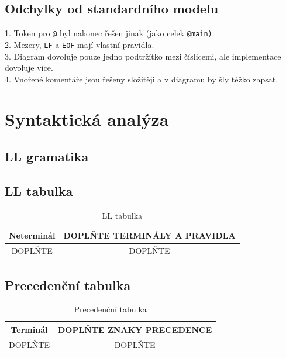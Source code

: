 \documentclass[10pt,a4paper]{article}
\begin{document}
\subsection{Odchylky od standardního modelu}
1. Token pro \texttt{@} byl nakonec řešen jinak (jako celek \texttt{@main)}. \\
2. Mezery, \texttt{LF} a \texttt{EOF} mají vlastní pravidla. \\
3. Diagram dovoluje pouze jedno podtržítko mezi číslicemi, ale implementace dovoluje více. \\
4. Vnořené komentáře jsou řešeny složitěji a v diagramu by šly těžko zapsat.

\section{Syntaktická analýza}
\subsection{LL gramatika}

\subsection{LL tabulka}

\begin{table}[H]
    \centering
    \caption{LL tabulka}
    \label{tab:ll}
    \begin{tabular}{c|c}
        \toprule
        \textbf{Neterminál} & \textbf{DOPLŇTE TERMINÁLY A PRAVIDLA} \\
        \midrule
        DOPLŇTE & DOPLŇTE \\
        \bottomrule
    \end{tabular}
\end{table}

\subsection{Precedenční tabulka}

\begin{table}[H]
    \centering
    \caption{Precedenční tabulka}
    \label{tab:precedence}
    \begin{tabular}{c|c}
        \toprule
        \textbf{Terminál} & \textbf{DOPLŇTE ZNAKY PRECEDENCE} \\
        \midrule
        DOPLŇTE & DOPLŇTE \\
        \bottomrule
    \end{tabular}
\end{table}
\end{document}
